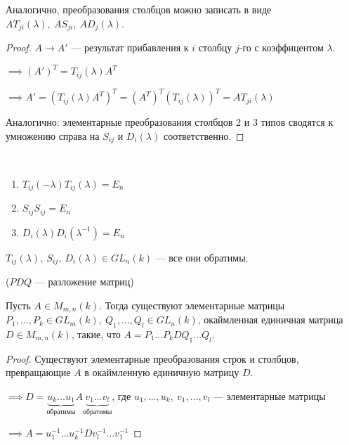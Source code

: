 \begin{follow}
    Аналогично, преобразования столбцов можно записать в виде $A T_{ji}(\lambda),~ A S_{ji},~ A D_j(\lambda)$.
\end{follow}

\begin{proof}
    $A \longrightarrow A'$ --- результат прибавления к $i$ столбцу $j$-го с коэффицентом $\lambda$.

    $\implies (A')^T = T_{ij}(\lambda) A^T$

    $\implies A' = (T_{ij}(\lambda) A^T)^T = (A^T)^T (T_{ij}(\lambda))^T = A T_{ji}(\lambda)$

    Аналогично: элементарные преобразования столбцов $2$ и $3$ типов сводятся к умножению справа на $S_{ij}$ и $D_i(\lambda)$ соответственно.
\end{proof}

\begin{follow}~

    \begin{enumerate}
        \item $T_{ij}(-\lambda) T_{ij}(\lambda) = E_n$
        
        \item $S_{ij} S_{ij} = E_n$
        
        \item $D_i(\lambda) D_i(\lambda^{-1}) = E_n$
    \end{enumerate}
\end{follow}

\begin{follow}
    $T_{ij}(\lambda),~ S_{ij},~ D_i(\lambda) \in GL_n(k)$ --- все они обратимы.
\end{follow}

\begin{theorem-non} ($PDQ$ --- разложение матриц)

    Пусть $A \in M_{m,n}(k)$. Тогда существуют элементарные матрицы $P_1, \ldots, P_k \in GL_m(k),~Q_1, \ldots, Q_l \in GL_n(k)$, окаймленная единичная матрица $D \in M_{m, n}(k)$, такие, что $A = P_1 \ldots P_k D Q_1 \ldots Q_l$.
\end{theorem-non}

\begin{proof}
    Существуют элементарные преобразования строк и столбцов, превращающие $A$ в окаймленную единичную матрицу $D$.

    $\implies D = \underbrace{u_k \ldots u_1}_{\text{обратимы}} A \underbrace{v_1 \ldots v_l}_{\text{обратимы}}$, где $u_1, \ldots, u_k,~ v_1, \ldots, v_l$ --- элементарные матрицы

    $\implies A = u_1^{-1} \ldots u_k^{-1} D v_l^{-1} \ldots v_1^{-1}$
\end{proof}

